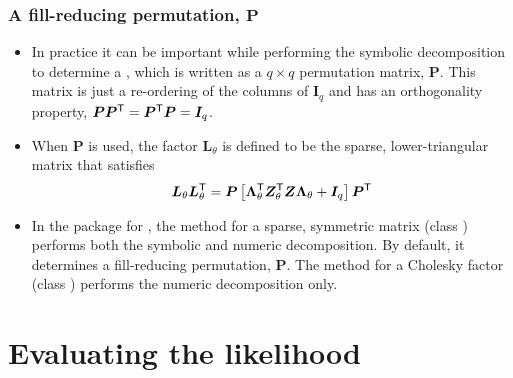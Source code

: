 \documentclass[dvipsnames,pdflatex,beamer]{beamer}
\newcommand{\bLt}{\ensuremath{\bm\Lambda_\theta}}
\begin{document}
\begin{frame}
  \frametitle{A fill-reducing permutation, $\bm P$}
  \begin{itemize}
  \item In practice it can be important while performing the symbolic
    decomposition to determine a ,
    which is written as a $q\times q$ permutation matrix, $\bm P$.
    This matrix is just a re-ordering of the columns of $\bm I_q$ and
    has an orthogonality property, $\bm P\bm P^\mathsf{T}=\bm
    P^\mathsf{T}\bm P=\bm I_q$.
  \item When $\bm P$ is used, the factor $\bm L_\theta$ is defined
    to be the sparse, lower-triangular matrix that satisfies
    \begin{displaymath}
      \bm L_\theta\bm L\trans_\theta=\bm P
      \left[\bLt\trans\bm Z\trans_\theta\bm Z\bLt+\bm I_q\right]
      \bm P\trans
    \end{displaymath}
  \item In the  package for \R, the 
    method for a sparse, symmetric matrix (class )
    performs both the symbolic and numeric decomposition.  By default,
    it determines a fill-reducing permutation, $\bm P$.  The
     method for a Cholesky factor (class
    ) performs the numeric decomposition only.
  \end{itemize}
\end{frame}

\section[Likelihood]{Evaluating the likelihood}
\end{document}
